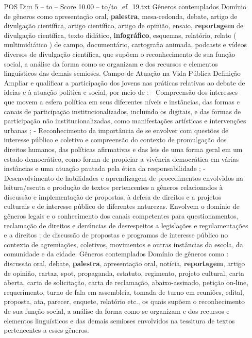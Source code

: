 \begin{textsample}{POS Dim 5 – to – Score 10.00 – to/to\_ef\_19.txt}
Gêneros contemplados Domínio de gêneros como apresentação oral, \textbf{palestra}, mesa-redonda, debate, artigo de divulgação científica, artigo científico, artigo de opinião, ensaio, \textbf{reportagem} de divulgação científica, texto didático, \textbf{infográfico}, esquemas, relatório, relato ( multimidiático ) de campo, documentário, cartografia animada, podcasts e vídeos diversos de divulgação científica, que supõem o reconhecimento de sua função social, a análise da forma como se organizam e dos recursos e elementos linguísticos das demais semioses.
Campo de Atuação na Vida Pública Definição Ampliar e qualificar a participação dos jovens nas práticas relativas ao debate de ideias e à atuação política e social, por meio de : - Compreensão dos interesses que movem a esfera política em seus diferentes níveis e instâncias, das formas e canais de participação institucionalizados, incluindo os digitais, e das formas de participação não institucionalizadas, como manifestações artísticas e intervenções urbanas ; - Reconhecimento da importância de se envolver com questões de interesse público e coletivo e compreensão do contexto de promulgação dos direitos humanos, das políticas afirmativas e das leis de uma forma geral em um estado democrático, como forma de propiciar a vivência democrática em várias instâncias e uma atuação pautada pela ética da responsabilidade ; - Desenvolvimento de habilidades e aprendizagem de procedimentos envolvidos na leitura/escuta e produção de textos pertencentes a gêneros relacionados à discussão e implementação de propostas, à defesa de direitos e a projetos culturais e de interesse público de diferentes naturezas.
Envolvem o domínio de gêneros legais e o conhecimento dos canais competentes para questionamentos, reclamação de direitos e denúncias de desrespeitos a legislações e regulamentações e a direitos ; de discussão de propostas e programas de interesse público no contexto de agremiações, coletivos, movimentos e outras instâncias da escola, da comunidade e da cidade.
Gêneros contemplados Domínio de gêneros como : discussão oral, debate, \textbf{palestra}, apresentação oral, notícia, \textbf{reportagem}, artigo de opinião, cartaz, spot, propaganda, estatuto, regimento, projeto cultural, carta aberta, carta de solicitação, carta de reclamação, abaixo-assinado, petição on-line, requerimento, turno de fala em assembleia, tomada de turno em reuniões, edital, proposta, ata, parecer, enquete, relatório etc., os quais supõem o reconhecimento de sua função social, a análise da forma como se organizam e dos recursos e elementos linguísticos e das demais semioses envolvidos na tessitura de textos pertencentes a esses gêneros.

\end{textsample}
